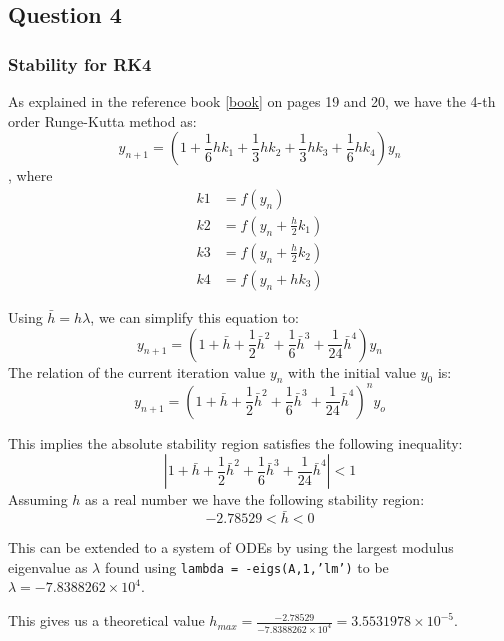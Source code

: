 \documentclass[a4paper, 11pt]{article}
\begin{document}
	
	\subsection*{Question 4}
		\subsubsection*{Stability for RK4}
			As explained in the reference book \ref{book} on pages 19 and 20, we have the 4-th order Runge-Kutta method as:
			\begin{equation}
				y_{n+1} = (1 + \frac{1}{6}hk_1 + \frac{1}{3}hk_2 + \frac{1}{3}hk_3 + \frac{1}{6}hk_4)y_n
			\end{equation}
			, where
			\begin{align}
					k1 &= f(y_{n}) \\
					k2 &= f(y_{n} + \frac{h}{2} k_1) \\
					k3 &= f(y_{n} + \frac{h}{2} k_2) \\
					k4 &= f(y_{n} + h k_3)
			\end{align}
		
			Using $ \bar{h} = h\lambda $, we can simplify this equation to:
			\begin{equation}
				y_{n+1} = (1 + \bar{h} + \frac{1}{2}\bar{h}^2 + \frac{1}{6}\bar{h}^3 + \frac{1}{24}\bar{h}^4)y_n
			\end{equation}
			The relation of the current iteration value $y_n$ with the initial value $y_0$ is:
			\begin{equation}
				y_{n+1} = (1 + \bar{h} + \frac{1}{2}\bar{h}^2 + \frac{1}{6}\bar{h}^3 + \frac{1}{24}\bar{h}^4)^n y_o
			\end{equation}
		
			This implies the absolute stability region satisfies the following inequality:
			\begin{equation}
				|1 + \bar{h} + \frac{1}{2}\bar{h}^2 + \frac{1}{6}\bar{h}^3 + \frac{1}{24}\bar{h}^4| < 1 
			\end{equation}
			Assuming $h$ as a real number we have the following stability region:
			\begin{equation}
				-2.78529 < \bar{h} < 0
			\end{equation}
			
			This can be extended to a system of ODEs by using the largest modulus eigenvalue as $ \lambda $ found using \texttt{lambda = -eigs(A,1,’lm’)} to be $ \lambda = -7.8388262\times 10^{4} $.		
			
			This gives us a theoretical value $h_{max} = \frac{-2.78529}{-7.8388262\times 10^{4}} = 3.5531978\times 10^{-5} $. 
			
\end{document}
